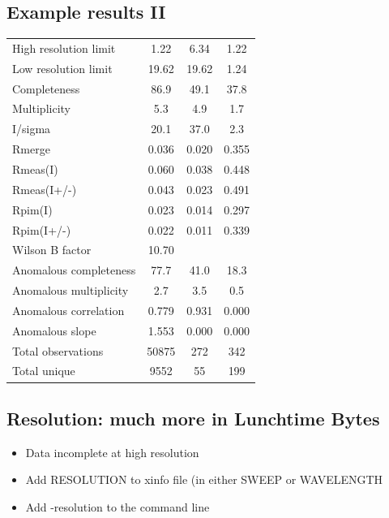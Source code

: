 \documentclass[a4paper, 11pt]{article}
\begin{document}
\subsection{Example results II}
\begin{tabular}{lccc}
High resolution limit         &         1.22 &  6.34 &  1.22 \\
Low resolution limit          &        19.62 & 19.62 &  1.24 \\
Completeness                  &         86.9 &  49.1 &  37.8 \\
Multiplicity                  &        5.3  &  4.9   & 1.7 \\
I/sigma                       &        20.1 &  37.0  &  2.3 \\
Rmerge                        &       0.036 & 0.020  &0.355 \\
Rmeas(I)                      &       0.060 & 0.038  &0.448 \\
Rmeas(I+/-)                   &       0.043 & 0.023  &0.491 \\
Rpim(I)                       &       0.023 & 0.014  &0.297 \\
Rpim(I+/-)                    &       0.022 & 0.011  &0.339 \\
Wilson B factor               &       10.70& \\
Anomalous completeness        &        77.7  & 41.0  & 18.3 \\
Anomalous multiplicity        &         2.7  &  3.5  &  0.5 \\
Anomalous correlation         &        0.779 & 0.931 & 0.000 \\
Anomalous slope               &       1.553  &0.000 & 0.000 \\
Total observations            &       50875  &272   & 342 \\
Total unique                  &       9552   &55    & 199 \\
\end{tabular}

\subsection{Resolution: much more in Lunchtime Bytes}
\begin{itemize}
\item{Data incomplete at high resolution}
\item{Add RESOLUTION to xinfo file (in either SWEEP or WAVELENGTH}
\item{Add -resolution to the command line}
\end{itemize}
\end{document}

